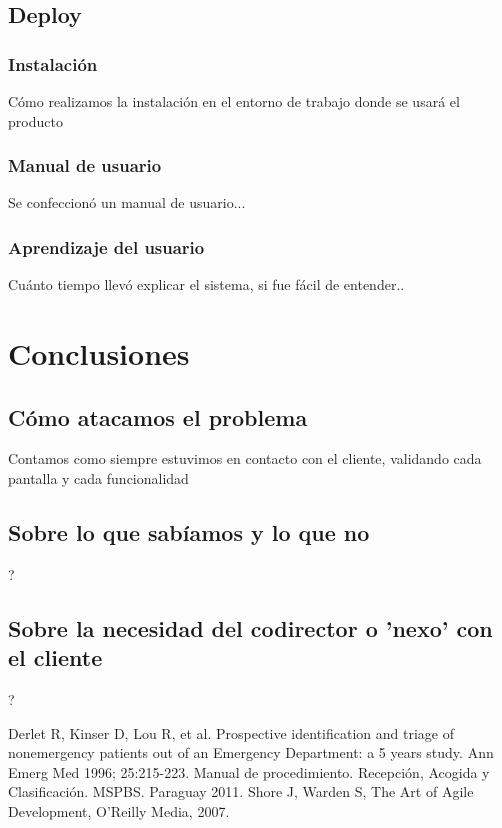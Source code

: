 \documentclass[a4paper,10pt]{article}
\begin{document}
\subsection{Deploy}
\subsubsection{Instalación}
Cómo realizamos la instalación en el entorno de trabajo donde se usará el producto
\subsubsection{Manual de usuario}
Se confeccionó un manual de usuario...
\subsubsection{Aprendizaje del usuario}
Cuánto tiempo llevó explicar el sistema, si fue fácil de entender..

\newpage 
\section{Conclusiones}
\subsection{Cómo atacamos el problema}
Contamos como siempre estuvimos en contacto con el cliente, validando cada pantalla y cada funcionalidad
\subsection{Sobre lo que sabíamos y lo que no}
?
\subsection{Sobre la necesidad del codirector o 'nexo' con el cliente}
?



\newpage 

\begin{thebibliography}{3} 
\bibitem{} Derlet R, Kinser D, Lou R, et al. Prospective identification and triage of nonemergency patients out of an Emergency Department: a 5 years study. Ann Emerg Med 1996; 25:215-223.
\bibitem{} Manual de procedimiento. Recepción,  Acogida y Clasificación.  MSPBS. Paraguay 2011.
\bibitem{} Shore J, Warden S, The Art of Agile Development, O’Reilly Media, 2007.

\end{thebibliography}
 
\end{document}
